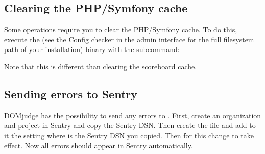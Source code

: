 \documentclass[a4paper,10pt,english,openany]{sphinxmanual}
\begin{document}
\begin{sphinxVerbatim}[commandchars=\\\{\}]
   \PYGZbs{}
     \PYGZbs{}
      \PYGZbs{}
    
\end{sphinxVerbatim}


\subsection{Clearing the PHP/Symfony cache}
\label{\detokenize{config-advanced:clearing-the-php-symfony-cache}}\label{\detokenize{config-advanced:clear-cache}}
\sphinxAtStartPar
Some operations require you to clear the PHP/Symfony cache. To do this, execute
the  (see the Config checker in the admin interface for the
full filesystem path of your installation) binary with the  subcommand:

\begin{sphinxVerbatim}[commandchars=\\\{\}]
 
\end{sphinxVerbatim}

\sphinxAtStartPar
Note that this is different than clearing the scoreboard cache.


\subsection{Sending errors to Sentry}
\label{\detokenize{config-advanced:sending-errors-to-sentry}}
\sphinxAtStartPar
DOMjudge has the possibility to send any errors to . First, create an
organization and project in Sentry and copy the Sentry DSN. Then create the file
 and add to it the setting  where
 is the Sentry DSN you copied. Then {\hyperref[\detokenize{config-advanced:clear-cache}]{}}
for this change to take effect. Now all errors should appear in Sentry
automatically.
\end{document}
